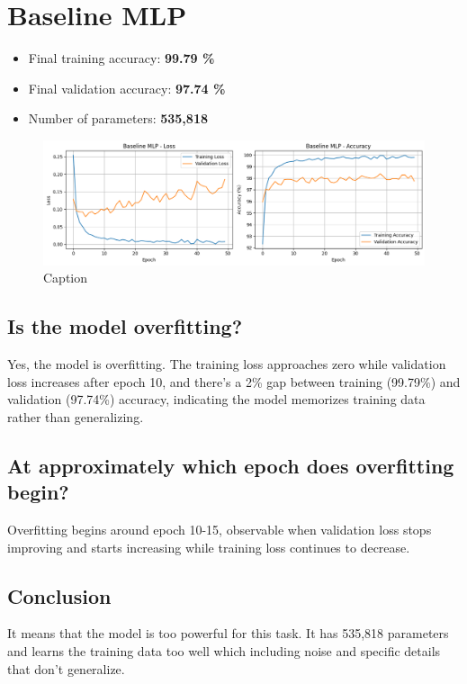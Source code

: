 \section{Baseline MLP}
\begin{itemize}
    \item Final training accuracy: \textbf{99.79 \%}
    \item Final validation accuracy: \textbf{97.74 \%}
    \item Number of parameters:  \textbf{535,818}
\end{itemize}

\begin{figure}[h]
    \centering
    \includegraphics[width=0.5\linewidth]{section1/baselineMLP.png}
    \caption{Caption}
    \label{fig:placeholder}
\end{figure}

\subsection{Is the model overfitting?}
Yes, the model is overfitting. The training loss approaches zero while validation loss increases after epoch 10, and there's a 2\% gap between training (99.79\%) and validation (97.74\%) accuracy, indicating the model memorizes training data rather than generalizing.

\subsection{At approximately which epoch does overfitting begin?}
Overfitting begins around epoch 10-15, observable when validation loss stops improving and starts increasing while training loss continues to decrease.

\subsection{Conclusion}
It means that the model is too powerful for this task. It has 535,818 parameters and learns the training data too well which including noise and specific details that don't generalize.

